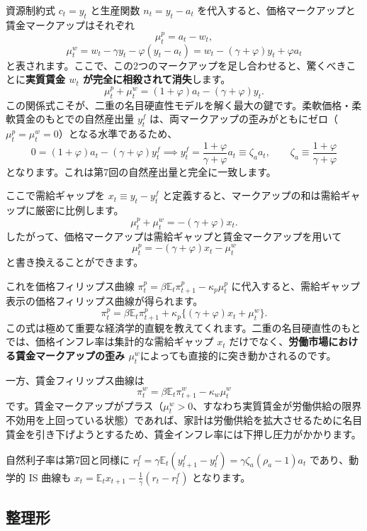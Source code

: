 \documentclass[
  japanese,
  lualatex,
  ja=standard,
  12pt,
  a4paper]{ltjsarticle}
\begin{document}
資源制約式 \(c_t=y_t\) と生産関数 \(n_t=y_t-a_t\)
を代入すると、価格マークアップと賃金マークアップはそれぞれ \[
\mu^p_t=a_t-w_t,
\] \[
\mu^w_t
=
w_t-\gamma y_t-\varphi(y_t-a_t)
=
w_t-(\gamma+\varphi)y_t+\varphi a_t
\]
と表されます。ここで、この2つのマークアップを足し合わせると、驚くべきことに\textbf{実質賃金
\(w_t\) が完全に相殺されて消失}します。 \[
\mu^p_t+\mu^w_t
=
(1+\varphi)a_t-(\gamma+\varphi)y_t.
\]
この関係式こそが、二重の名目硬直性モデルを解く最大の鍵です。柔軟価格・柔軟賃金のもとでの自然産出量
\(y_t^f\)
は、両マークアップの歪みがともにゼロ（\(\mu_t^p = \mu_t^w = 0\)）となる水準であるため、
\[
0 = (1+\varphi)a_t-(\gamma+\varphi)y_t^f
\implies
y_t^f = \frac{1+\varphi}{\gamma+\varphi}a_t \equiv \zeta_a a_t,
\qquad
\zeta_a \equiv \frac{1+\varphi}{\gamma+\varphi}
\] となります。これは第7回の自然産出量と完全に一致します。

ここで需給ギャップを \(x_t \equiv y_t - y_t^f\)
と定義すると、マークアップの和は需給ギャップに厳密に比例します。 \[
\mu^p_t+\mu^w_t
=
-(\gamma+\varphi)x_t.
\] したがって、価格マークアップは需給ギャップと賃金マークアップを用いて
\[
\mu^p_t
=
-(\gamma+\varphi)x_t-\mu^w_t
\] と書き換えることができます。

これを価格フィリップス曲線
\(\pi_t^p = \beta\mathbb{E}_t\pi_{t+1}^p - \kappa_p \mu_t^p\)
に代入すると、需給ギャップ表示の価格フィリップス曲線が得られます。 \[
\pi^p_t
=
\beta\mathbb{E}_t\pi^p_{t+1}
+
\kappa_p\{(\gamma+\varphi)x_t+\mu^w_t\}.
\]
この式は極めて重要な経済学的直観を教えてくれます。二重の名目硬直性のもとでは、価格インフレ率は集計的な需給ギャップ
\(x_t\) だけでなく、\textbf{労働市場における賃金マークアップの歪み
\(\mu_t^w\)}によっても直接的に突き動かされるのです。

一方、賃金フィリップス曲線は \[
\pi^w_t
=
\beta\mathbb{E}_t\pi^w_{t+1}
-
\kappa_w\mu^w_t
\]
です。賃金マークアップがプラス（\(\mu_t^w>0\)、すなわち実質賃金が労働供給の限界不効用を上回っている状態）であれば、家計は労働供給を拡大させるために名目賃金を引き下げようとするため、賃金インフレ率には下押し圧力がかかります。

自然利子率は第7回と同様に
\(r_t^f = \gamma\mathbb{E}_t(y^f_{t+1}-y^f_t) = \gamma\zeta_a(\rho_a-1)a_t\)
であり、動学的 IS 曲線も
\(x_t = \mathbb{E}_t x_{t+1} - \frac{1}{\gamma}(r_t-r_t^f)\)
となります。

\subsection{整理形}\label{ux6574ux7406ux5f62}
\end{document}
